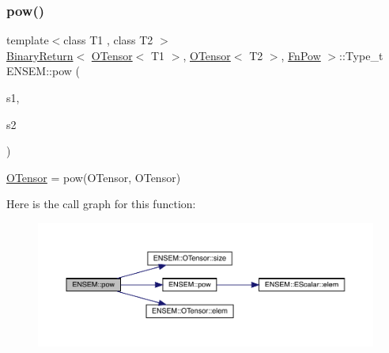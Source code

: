 \subsubsection{\texorpdfstring{pow()}{pow()}\hspace{0.1cm}{\footnotesize\ttfamily [1/3]}}
{\footnotesize\ttfamily template$<$class T1 , class T2 $>$ \\
\mbox{\hyperlink{structENSEM_1_1BinaryReturn}{Binary\+Return}}$<$ \mbox{\hyperlink{classENSEM_1_1OTensor}{O\+Tensor}}$<$ T1 $>$, \mbox{\hyperlink{classENSEM_1_1OTensor}{O\+Tensor}}$<$ T2 $>$, \mbox{\hyperlink{structENSEM_1_1FnPow}{Fn\+Pow}} $>$\+::Type\+\_\+t E\+N\+S\+E\+M\+::pow (\begin{DoxyParamCaption}\item[{const \mbox{\hyperlink{classENSEM_1_1OTensor}{O\+Tensor}}$<$ T1 $>$ \&}]{s1,  }\item[{const \mbox{\hyperlink{classENSEM_1_1OTensor}{O\+Tensor}}$<$ T2 $>$ \&}]{s2 }\end{DoxyParamCaption})\hspace{0.3cm}{\ttfamily [inline]}}



\mbox{\hyperlink{classENSEM_1_1OTensor}{O\+Tensor}} = pow(\+O\+Tensor, O\+Tensor) 

Here is the call graph for this function\+:\nopagebreak
\begin{figure}[H]
\begin{center}
\leavevmode
\includegraphics[width=350pt]{de/d87/group__obstensor_ga94691b9c2a192ce60f55f93a4ccf1974_cgraph}
\end{center}
\end{figure}
\mbox{\label{group__obstensor_ga5d6fdaa96c08e10d2006c495cb0af217}} 
